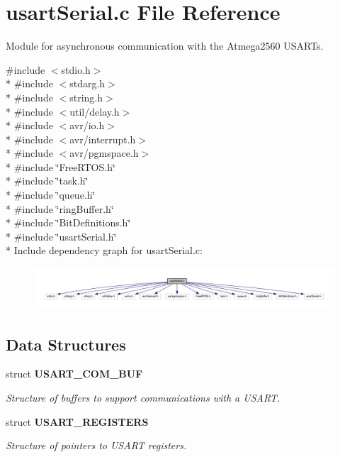\section{usart\+Serial.\+c File Reference}
\label{usart_serial_8c}


Module for asynchronous communication with the Atmega2560 U\+S\+A\+R\+T\textquotesingle{}s.  


{\ttfamily \#include $<$stdio.\+h$>$}\\*
{\ttfamily \#include $<$stdarg.\+h$>$}\\*
{\ttfamily \#include $<$string.\+h$>$}\\*
{\ttfamily \#include $<$util/delay.\+h$>$}\\*
{\ttfamily \#include $<$avr/io.\+h$>$}\\*
{\ttfamily \#include $<$avr/interrupt.\+h$>$}\\*
{\ttfamily \#include $<$avr/pgmspace.\+h$>$}\\*
{\ttfamily \#include \char`\"{}Free\+R\+T\+O\+S.\+h\char`\"{}}\\*
{\ttfamily \#include \char`\"{}task.\+h\char`\"{}}\\*
{\ttfamily \#include \char`\"{}queue.\+h\char`\"{}}\\*
{\ttfamily \#include \char`\"{}ring\+Buffer.\+h\char`\"{}}\\*
{\ttfamily \#include \char`\"{}Bit\+Definitions.\+h\char`\"{}}\\*
{\ttfamily \#include \char`\"{}usart\+Serial.\+h\char`\"{}}\\*
Include dependency graph for usart\+Serial.\+c\+:\nopagebreak
\begin{figure}[H]
\begin{center}
\leavevmode
\includegraphics[width=350pt]{usart_serial_8c__incl}
\end{center}
\end{figure}
\subsection*{Data Structures}
\begin{DoxyCompactItemize}
\item 
struct {\bf U\+S\+A\+R\+T\+\_\+\+C\+O\+M\+\_\+\+B\+U\+F}
\begin{DoxyCompactList}\small\item\em Structure of buffers to support communications with a U\+S\+A\+R\+T. \end{DoxyCompactList}\item 
struct {\bf U\+S\+A\+R\+T\+\_\+\+R\+E\+G\+I\+S\+T\+E\+R\+S}
\begin{DoxyCompactList}\small\item\em Structure of pointers to U\+S\+A\+R\+T registers. \end{DoxyCompactList}\end{DoxyCompactItemize}
